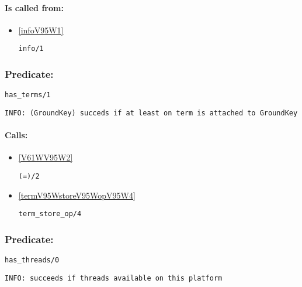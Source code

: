 \paragraph{Is called from:} 
\begin{itemize}
\item \ref{infoV95W1} 
\begin{verbatim}
info/1
\end{verbatim}

\end{itemize}

\subsubsection{Predicate:} \label{hasV95WtermsV95W1}

\begin{verbatim}
has_terms/1
\end{verbatim}

{\small \begin{verbatim}
INFO: (GroundKey) succeds if at least on term is attached to GroundKey

\end{verbatim}}
\paragraph{Calls:} 
\begin{itemize}
\item \ref{V61WV95W2} 
\begin{verbatim}
(=)/2
\end{verbatim}

\item \ref{termV95WstoreV95WopV95W4} 
\begin{verbatim}
term_store_op/4
\end{verbatim}

\end{itemize}

\subsubsection{Predicate:} \label{hasV95WthreadsV95W0}

\begin{verbatim}
has_threads/0
\end{verbatim}

{\small \begin{verbatim}
INFO: succeeds if threads available on this platform

\end{verbatim}}
